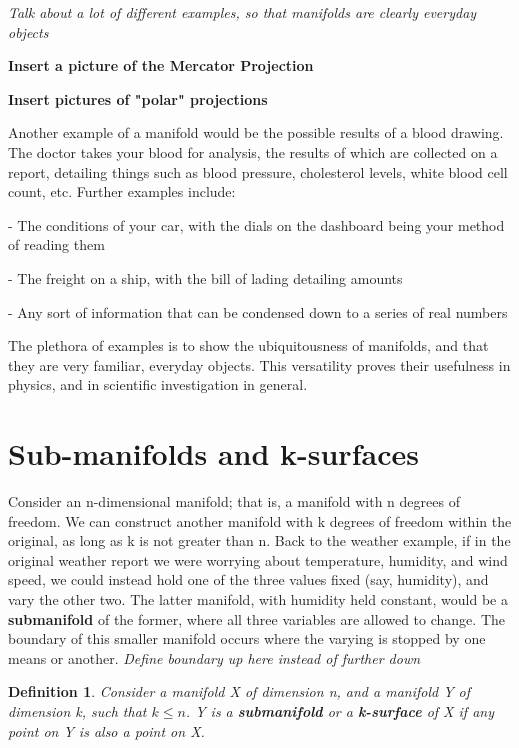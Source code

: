 \documentclass{book}
\newtheorem{defn}[equation]{Definition}
\begin{document}
\textit{Talk about a lot of different examples, so that manifolds are clearly everyday objects}

\textbf{Insert a picture of the Mercator Projection}

\textbf{Insert pictures of "polar" projections}

Another example of a manifold would be the possible results of a blood drawing. The doctor takes your blood for analysis, the results of which are collected on a report, detailing things such as blood pressure, cholesterol levels, white blood cell count, etc. Further examples include: 

- The conditions of your car, with the dials on the dashboard being your method of reading them 

- The freight on a ship, with the bill of lading detailing amounts

- Any sort of information that can be condensed down to a series of real numbers

The plethora of examples is to show the ubiquitousness of manifolds, and that they are very familiar, everyday objects. This versatility proves their usefulness in physics, and in scientific investigation in general. 

\section{Sub-manifolds and k-surfaces}

Consider an n-dimensional manifold; that is, a manifold with n degrees of freedom. We can construct another manifold with k degrees of freedom within the original, as long as k is not greater than n. Back to the weather example, if in the original weather report we were worrying about temperature, humidity, and wind speed, we could instead hold one of the three values fixed (say, humidity), and vary the other two. The latter manifold, with humidity held constant, would be a \textbf{submanifold} of the former, where all three variables are allowed to change. The boundary of this smaller manifold occurs where the varying is stopped by one means or another. 
\textit{Define boundary up here instead of further down}


\begin{defn}
	Consider a manifold X of dimension n, and a manifold Y of dimension k, such that $k \leq n$. Y is a \textbf{submanifold} or a \textbf{k-surface} of X if any point on Y is also a point on X. 
\end{defn}
\end{document}
